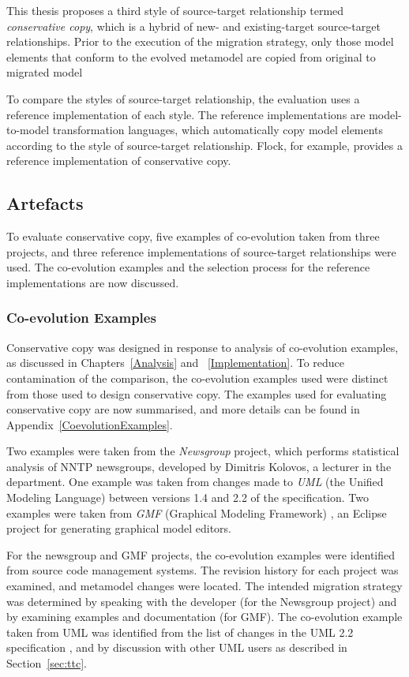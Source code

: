 This thesis proposes a third style of source-target relationship termed \emph{conservative copy}, which is a hybrid of new- and existing-target source-target relationships. Prior to the execution of the migration strategy, only those model elements that conform to the evolved metamodel are copied from original to migrated model

To compare the styles of source-target relationship, the evaluation uses a reference implementation of each style. The reference implementations are model-to-model transformation languages, which automatically copy model elements according to the style of source-target relationship. Flock, for example, provides a reference implementation of conservative copy.


\subsection{Artefacts}
\label{subsec:quantitive_equipment}
To evaluate conservative copy, five examples of co-evolution taken from three projects, and three reference implementations of source-target relationships were used. The co-evolution examples and the selection process for the reference implementations are now discussed.

\subsubsection{Co-evolution Examples}
Conservative copy was designed in response to analysis of co-evolution examples, as discussed in Chapters~\ref{Analysis} and ~\ref{Implementation}. To reduce contamination of the comparison, the co-evolution examples used were distinct from those used to design conservative copy. The examples used for evaluating conservative copy are now summarised, and more details can be found in Appendix~\ref{CoevolutionExamples}.

Two examples were taken from the \emph{Newsgroup} project, which performs statistical analysis of NNTP newsgroups, developed by Dimitris Kolovos, a lecturer in the department. One example was taken from changes made to \emph{UML} (the Unified Modeling Language) between versions 1.4 \cite{uml14} and 2.2 \cite{uml22} of the specification. Two examples were taken from \emph{GMF} (Graphical Modeling Framework) \cite{gronback09emp}, an Eclipse project for generating graphical model editors.

For the newsgroup and GMF projects, the co-evolution examples were identified from source code management systems. The revision history for each project was examined, and metamodel changes were located. The intended migration strategy was determined by speaking with the developer (for the Newsgroup project) and by examining examples and documentation (for GMF). The co-evolution example taken from UML was identified from the list of changes in the UML 2.2 specification \cite{uml22}, and by discussion with other UML users as described in Section~\ref{sec:ttc}.

